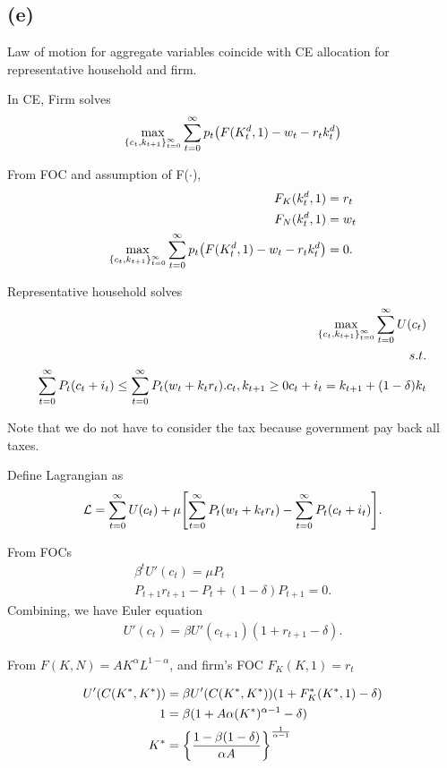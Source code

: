 \documentclass{ltjsarticle}
\begin{document}
\subsection*{(e)}
Law of motion for aggregate variables coincide with CE allocation for representative household and firm.

In CE, Firm solves
\begin{align*}
    \max_{\{c_t, k_{t+1}\}^{\infty}_{t=0}} \sum^{\infty}_{t=0} p_t\qty(F(K^d_t,1)-w_t -r_tk_t^d)
\end{align*}

From FOC and assumption of F($\cdot$),
\begin{align*}
    F_K(k_t^d,1)&=r_t\\
    F_N(k_t^d,1)&=w_t\\
    \max_{\{c_t, k_{t+1}\}^{\infty}_{t=0}} \sum^{\infty}_{t=0} p_t\qty(F(K^d_t,1)-w_t -r_tk_t^d)&=0.
\end{align*}

Representative household solves
\begin{align*}
    \max_{\qty{c_t,k_{t+1}}^{\infty}_{t=0}} \sum^{\infty}_{t=0} U(c_t)\\
    s.t.\\
    \sum^{\infty}_{t=0} P_t\qty(c_t + i_t) \leq \sum^{\infty}_{t=0} P_t \qty(w_t+k_t r_t).
    c_t, k_{t+1} \geq 0
    c_t + i_t = k_{t+1} + (1-\delta)k_t
\end{align*}

Note that we do not have to consider the tax because government pay back all taxes.

Define Lagrangian as 
$$\mathcal{L}=\sum^{\infty}_{t=0} U(c_t) + \mu\qty[ \sum^{\infty}_{t=0} P_t \qty(w_t+k_t r_t) - \sum^{\infty}_{t=0} P_t\qty(c_t + i_t)].$$

From FOCs
\begin{align*}
    \beta^t U'(c_t)=\mu P_t\\
    P_{t+1}r_{t+1} -P_t + (1-\delta)P_{t+1}=0.
\end{align*}
Combining, we have Euler equation
\begin{align*}
    U'(c_t)=\beta U'(c_{t+1})(1+r_{t+1}-\delta).
\end{align*}

From $F(K,N)=AK^\alpha L^{1-\alpha}$, and firm's FOC $F_K(K,1)=r_t$

\begin{align*}
    U'(C(K^{*},K^{*}))&=\beta U'(C(K^{*},K^{*}))(1+F_K^{*}(K^{*},1)-\delta)\\
    1&=\beta (1+A\alpha (K^{*})^{\alpha-1}-\delta)\\
    K^{*}&=\qty{\frac{1-\beta(1-\delta)}{\alpha A}}^{\frac{1}{\alpha-1}}
\end{align*}
\end{document}
